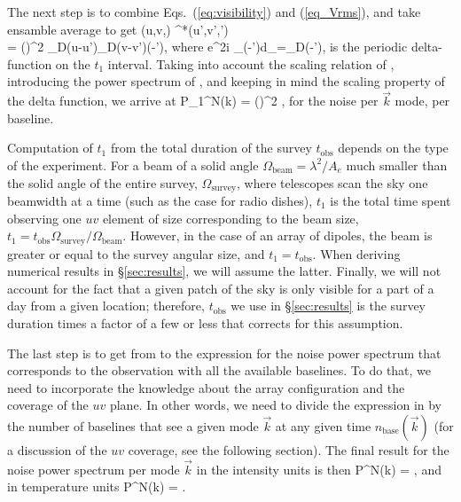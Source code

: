 The next step is to combine Eqs.~(\ref{eq:visibility}) and (\ref{eq_Vrms}), and take ensamble average to get
\beq
\bga
\langle{}(u,v,\eta) ^*(u',v',\eta')\rangle \\
 = \left(\right)^2 \delta_D({u}-{u}')\delta_D({v}-{v}')\delta(\eta-\eta'),
\ega
\label{eq:mathcal_power_Vrms}
\eeq 
where 
\beq
\int e^{2\pi i \theta_\nu(\eta-\eta')}d\theta_\nu =\delta_D(\eta-\eta'),
\eeq
is the periodic delta-function on the $t_1$ interval.  Taking into account the scaling relation of \eq{\ref{eq_tilde_I_vs_Ik_scaling}}, introducing the power spectrum of \eq{\ref{eq_tildeI_power}}, and keeping in mind the scaling property of the delta function, we arrive at
\beq
P_1^N(\vec k) = \left(\right)^2 ,
\label{eq:Pnoise_1mode}
\eeq
for the noise per $\vec k$ mode, per baseline.

Computation of $t_1$ from the total duration of the survey  $t_\text{obs}$ depends on the type of the experiment.  For a beam of a solid angle $\Omega_\text{beam}=\lambda^2/A_e$ much smaller than the solid angle of the entire survey, $\Omega_\text{survey}$, where telescopes scan the sky one beamwidth at a time (such as the case for radio dishes), $t_1$ is the total time spent observing one $uv$ element of size corresponding to the beam size, $t_1=t_\text{obs}\Omega_\text{survey}/\Omega_\text{beam}$. However, in the case of an array of dipoles, the beam is greater or equal to the survey angular size, and $t_1=t_\text{obs}$. When deriving numerical results in \S\ref{sec:results}, we will assume the latter. Finally, we will not account for the fact that a given patch of the sky is only visible for a part of a day from a given location; therefore, $t_\text{obs}$ we use in \S\ref{sec:results} is the survey duration times a factor of a few or less that corrects for this assumption.

The last step is to get from \eq{\ref{eq:Pnoise_1mode}} to the expression for the noise power spectrum that corresponds to the observation with all the available baselines. To do that, we need to incorporate the knowledge about the array configuration and the coverage of the $uv$ plane. In other words, we need to divide the expression in \eq{\ref{eq:Pnoise_1mode}} by the number of baselines that see a given mode $\vec k$ at any given time $n_\text{base}(\vec k)$ (for a discussion of the $uv$ coverage, see the following section). The final result for the noise power spectrum per mode $\vec k$ in the intensity units is then
\beq
P^N(\vec k) = ,
\label{eq:Pnoise_Jy}
\eeq
and in temperature units
\beq
P^N(\vec k) = .
\label{eq:Pnoise_K}
\eeq
